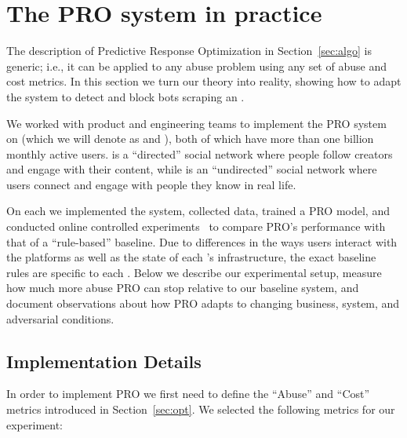 \section{The PRO system in practice}\label{sec:system_in_practice}

The description of Predictive Response Optimization in Section~\ref{sec:algo} is generic; i.e., it can be applied to any \osn abuse problem using any set of abuse and cost metrics. In this section we turn our theory into reality, showing how to adapt the system to detect and block bots scraping an \osn.

We worked with product and engineering teams to implement the PRO system on \fbig\ifanon (which we will denote as \ig and \fb)\fi, both of which have more than one billion monthly active users. \ig is a ``directed'' social network where people follow creators and engage with their content, while \fb is an ``undirected'' social network where users connect and engage with people they know in real life.

On each \osn we implemented the system, collected data, trained a PRO model, and conducted online controlled experiments~\cite{abtest} to compare PRO's performance with that of a ``rule-based'' baseline. Due to differences in the ways users interact with the platforms as well as the state of each \osn's infrastructure, the exact baseline rules are specific to each \osn.
Below we describe our experimental setup, measure how much more abuse PRO can stop relative to our baseline system, and document observations about how PRO adapts to changing business, system, and adversarial conditions.


\subsection{Implementation Details}

 In order to implement PRO we first need to define the ``Abuse'' and ``Cost'' metrics introduced in Section~\ref{sec:opt}. We selected the following metrics for our experiment:


